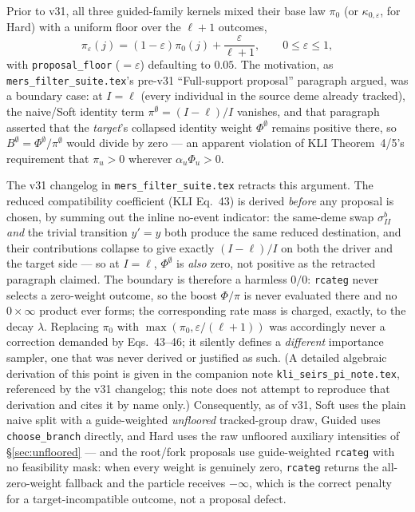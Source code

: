 \documentclass[11pt]{article}
\theoremstyle{plain}
\begin{document}
Prior to v31, all three guided-family kernels mixed their base law $\pi_0$ (or $\kappa_{0,\varepsilon}$, for
Hard) with a uniform floor over the $\ell+1$ outcomes,
\[
\pi_\varepsilon(j) = (1-\varepsilon)\pi_0(j) + \frac{\varepsilon}{\ell+1}, \qquad 0\le\varepsilon\le1,
\]
with \texttt{proposal\_floor} ($=\varepsilon$) defaulting to $0.05$. The motivation, as
\texttt{mers\_filter\_suite.tex}'s pre-v31 ``Full-support proposal'' paragraph argued, was a
boundary case: at $I=\ell$ (every individual in the source deme already tracked), the naive/Soft
identity term $\pi^\emptyset=(I-\ell)/I$ vanishes, and that paragraph asserted that the
\emph{target}'s collapsed identity weight $\Phi^\emptyset$ remains positive there, so
$B^\emptyset=\Phi^\emptyset/\pi^\emptyset$ would divide by zero --- an apparent violation of KLI
Theorem~4/5's requirement that $\pi_u>0$ wherever $\alpha_u\Phi_u>0$.

The v31 changelog in \texttt{mers\_filter\_suite.tex} retracts this argument. The reduced
compatibility coefficient (KLI Eq.~43) is derived \emph{before} any proposal is chosen, by summing
out the inline no-event indicator: the same-deme swap $\sigma^b_{II}$ \emph{and} the trivial
transition $y'=y$ both produce the same reduced destination, and their contributions collapse to
give exactly $(I-\ell)/I$ on both the driver and the target side --- so at $I=\ell$, $\Phi^\emptyset$
is \emph{also} zero, not positive as the retracted paragraph claimed. The boundary is therefore a
harmless $0/0$: \texttt{rcateg} never selects a zero-weight outcome, so the boost $\Phi/\pi$ is
never evaluated there and no $0\times\infty$ product ever forms; the corresponding rate mass is
charged, exactly, to the decay $\lambda$. Replacing $\pi_0$ with $\max(\pi_0,\varepsilon/(\ell{+}1))$
was accordingly never a correction demanded by Eqs.~43--46; it silently defines a
\emph{different} importance sampler, one that was never derived or justified as such. (A detailed
algebraic derivation of this point is given in the companion note \texttt{kli\_seirs\_pi\_note.tex},
referenced by the v31 changelog; this note does not attempt to reproduce that derivation and cites
it by name only.) Consequently, as of v31, Soft uses the plain naive split with a guide-weighted
\emph{unfloored} tracked-group draw, Guided uses \texttt{choose\_branch} directly, and Hard uses
the raw unfloored auxiliary intensities of \S\ref{sec:unfloored} --- and the root/fork proposals
use guide-weighted \texttt{rcateg} with no feasibility mask: when every weight is genuinely zero,
\texttt{rcateg} returns the all-zero-weight fallback and the particle receives $-\infty$, which is
the correct penalty for a target-incompatible outcome, not a proposal defect.
\end{document}
